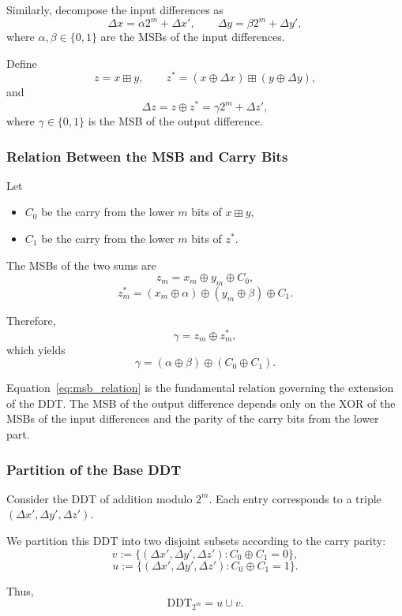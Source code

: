 \documentclass[runningheads]{llncs}
\begin{document}
Similarly, decompose the input differences as
\[
\Delta x = \alpha 2^m + \Delta x', \qquad
\Delta y = \beta 2^m + \Delta y',
\]
where $\alpha, \beta \in \{0,1\}$ are the MSBs of the input differences.

Define
\[
z = x \boxplus y, \qquad
z^* = (x \oplus \Delta x) \boxplus (y \oplus \Delta y),
\]
and
\[
\Delta z = z \oplus z^* = \gamma 2^m + \Delta z',
\]
where $\gamma \in \{0,1\}$ is the MSB of the output difference.

\subsubsection*{Relation Between the MSB and Carry Bits}

Let
\begin{itemize}
    \item $C_0$ be the carry from the lower $m$ bits of $x \boxplus y$,
    \item $C_1$ be the carry from the lower $m$ bits of $z^*$.
\end{itemize}

The MSBs of the two sums are
\[
z_m = x_m \oplus y_m \oplus C_0,
\]
\[
z_m^* = (x_m \oplus \alpha) \oplus (y_m \oplus \beta) \oplus C_1.
\]

Therefore,
\[
\gamma = z_m \oplus z_m^*,
\]
which yields
\begin{equation}
\gamma = (\alpha \oplus \beta) \oplus (C_0 \oplus C_1).
\label{eq:msb_relation}
\end{equation}

Equation~\eqref{eq:msb_relation} is the fundamental relation governing the extension of the DDT. The MSB of the output difference depends only on the XOR of the MSBs of the input differences and the parity of the carry bits from the lower part.

\subsubsection*{Partition of the Base DDT}

Consider the DDT of addition modulo $2^m$. Each entry corresponds to a triple $(\Delta x', \Delta y', \Delta z')$.

We partition this DDT into two disjoint subsets according to the carry parity:
\[
v := \{ (\Delta x', \Delta y', \Delta z') : C_0 \oplus C_1 = 0 \},
\]
\[
u := \{ (\Delta x', \Delta y', \Delta z') : C_0 \oplus C_1 = 1 \}.
\]

Thus,
\[
\mathrm{DDT}_{2^m} = u \cup v.
\]
\end{document}
